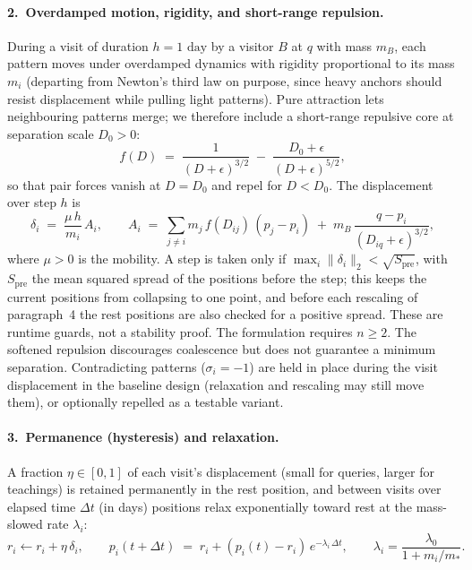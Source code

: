 \documentclass[11pt]{article}
\theoremstyle{remark}
\begin{document}
\paragraph{2.\ Overdamped motion, rigidity, and short-range repulsion.}
During a visit of duration $h = 1\text{ day}$ by a visitor $B$ at $q$ with mass $m_B$, each pattern moves under overdamped dynamics with rigidity proportional to its mass $m_i$ (departing from Newton's third law on purpose, since heavy anchors should resist displacement while pulling light patterns). Pure attraction lets neighbouring patterns merge; we therefore include a short-range repulsive core at separation scale $D_0 > 0$:
\begin{equation}
\label{eq:dyn_kernel}
f(D) \;=\; \frac{1}{(D+\epsilon)^{3/2}} \;-\; \frac{D_0+\epsilon}{(D+\epsilon)^{5/2}},
\end{equation}
so that pair forces vanish at $D = D_0$ and repel for $D < D_0$. The displacement over step $h$ is
\begin{equation}
\label{eq:dyn_motion}
\delta_i \;=\; \frac{\mu\,h}{m_i}\,A_i, \qquad
A_i \;=\; \sum_{j\neq i} m_j\,f(D_{ij})\,(p_j - p_i) \;+\; m_B\,\frac{q - p_i}{(D_{iq}+\epsilon)^{3/2}},
\end{equation}
where $\mu > 0$ is the mobility. A step is taken only if $\max_i \|\delta_i\|_2 < \sqrt{S_{\text{pre}}}$, with $S_{\text{pre}}$ the mean squared spread of the positions before the step; this keeps the current positions from collapsing to one point, and before each rescaling of paragraph~4 the rest positions are also checked for a positive spread. These are runtime guards, not a stability proof. The formulation requires $n\ge 2$. The softened repulsion discourages coalescence but does not guarantee a minimum separation. Contradicting patterns ($\sigma_i = -1$) are held in place during the visit displacement in the baseline design (relaxation and rescaling may still move them), or optionally repelled as a testable variant.

\paragraph{3.\ Permanence (hysteresis) and relaxation.}
A fraction $\eta\in[0,1]$ of each visit's displacement (small for queries, larger for teachings) is retained permanently in the rest position, and between visits over elapsed time $\Delta t$ (in days) positions relax exponentially toward rest at the mass-slowed rate $\lambda_i$:
\begin{equation}
\label{eq:dyn_relax}
r_i \leftarrow r_i + \eta\,\delta_i, \qquad
p_i(t+\Delta t) \;=\; r_i + (p_i(t) - r_i)\,e^{-\lambda_i\,\Delta t}, \qquad
\lambda_i = \frac{\lambda_0}{1 + m_i/m_\ast}.
\end{equation}
\end{document}
